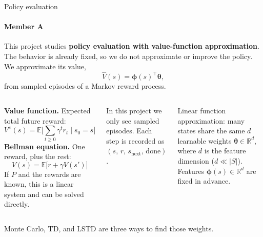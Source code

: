 \documentclass[aspectratio=169,11pt]{beamer}
\newcommand{\memberA}{Member A}
\newcommand{\speaker}[1]{\framesubtitle{#1}}
\newcommand{\hl}[1]{\textcolor{accent}{\textbf{#1}}}
\newcommand{\vphi}{\bm{\phi}}
\newcommand{\vth}{\bm{\theta}}
\begin{document}
\begin{frame}{Policy evaluation}
  \speaker{\memberA}
  \small
  \setlength{\abovedisplayskip}{0.35em}%
  \setlength{\belowdisplayskip}{0.35em}%
  This project studies \hl{policy evaluation with value-function approximation}. The behavior is already fixed, so we do not approximate or improve the policy. We approximate its value,
  \[
    \hat V(s)=\vphi(s)^\top\vth,
  \]
  from sampled episodes of a Markov reward process.
  \vspace{0.35em}
  \begin{columns}[T]
    \textbf{Value function.} Expected total future reward:
    \[ V^\pi(s)=\mathbb{E}\Big[\sum_{t\ge 0}\gamma^t r_t \;\Big|\; s_0=s\Big] \]
    \textbf{Bellman equation.} One reward, plus the rest:
    \[ V(s)=\mathbb{E}\big[r+\gamma V(s')\big] \]
    If $P$ and the rewards are known, this is a linear system and can be solved directly.
    \vspace{0.45em}

    In this project we only see sampled episodes. Each step is recorded as $(s,\, r,\, s_{\mathrm{next}},\, \mathrm{done})$.
    \vspace{0.45em}

    Linear function approximation: many states share the same $d$ learnable weights $\vth \in \mathbb{R}^d$, where $d$ is the feature dimension ($d \ll |S|$). Features $\vphi(s) \in \mathbb{R}^d$ are fixed in advance.
  \end{columns}
  \vspace{0.15em}
  \begin{keyidea}
    Monte Carlo, TD, and LSTD are three ways to find those weights.
  \end{keyidea}
\end{frame}
\end{document}
